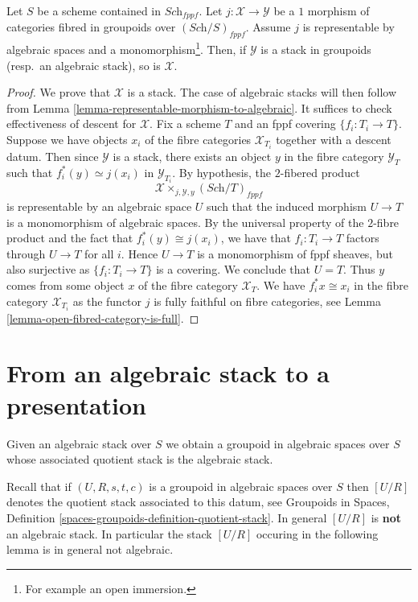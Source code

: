 \begin{lemma}
\label{lemma-open-fibred-category-is-algebraic} 
Let $S$ be a scheme contained in $\textit{Sch}_{fppf}$. 
Let $j : \mathcal X \to \mathcal Y$ be a $1$ morphism of
categories fibred in groupoids over $(\textit{Sch}/S)_{fppf}$.
Assume $j$ is representable by algebraic spaces and a
monomorphism\footnote{For example an open immersion.}.
Then, if $\mathcal{Y}$ is a stack in groupoids (resp.\ an algebraic stack),
so is $\mathcal{X}$. 
\end{lemma}

\begin{proof}
We prove that $\mathcal X$ is a stack.
The case of algebraic stacks will then follow from Lemma 
\ref{lemma-representable-morphism-to-algebraic}. 
It suffices to check effectiveness of descent for $\mathcal X$.
Fix a scheme $T$ and an fppf covering $\{f_i : T_i \to T\}$.
Suppose we have objects $x_i$ of the fibre categories
$\mathcal{X}_{T_i}$ together with a descent datum.
Then since $\mathcal{Y}$ is a stack, there exists an object
$y$ in the fibre category $\mathcal{Y}_{T}$ such that
$f_i^*(y) \simeq j(x_i)$ in $\mathcal{Y}_{T_i}$.
By hypothesis, the $2$-fibered product
$$
\mathcal X \times_{j, \mathcal Y, y} (\textit{Sch}/T)_{fppf}
$$
is representable by an algebraic space $U$ such that the induced morphism
$U \to T$ is a monomorphism of algebraic spaces. By the universal property
of the $2$-fibre product and the fact that $f_i^*(y) \cong j(x_i)$, we have
that $f_i : T_i \to T$ factors through $U \to T$ for all $i$.
Hence $U \to T$ is a monomorphism of fppf sheaves, but also surjective
as $\{f_i : T_i \to T\}$ is a covering.
We conclude that $U = T$. Thus $y$ comes from some
object $x$ of the fibre category $\mathcal{X}_T$. We have
$f_i^*x \cong x_i$ in the fibre category $\mathcal{X}_{T_i}$ as the
functor $j$ is fully faithful on fibre categories, see
Lemma \ref{lemma-open-fibred-category-is-full}.
\end{proof}



\section{From an algebraic stack to a presentation}
\label{section-stack-to-presentation}

\noindent
Given an algebraic stack over $S$ we obtain a groupoid in algebraic spaces
over $S$ whose associated quotient stack is the algebraic stack.

\medskip\noindent
Recall that if $(U, R, s, t, c)$ is a groupoid in algebraic spaces over $S$
then $[U/R]$ denotes the quotient stack associated to this datum, see
Groupoids in Spaces,
Definition \ref{spaces-groupoids-definition-quotient-stack}.
In general $[U/R]$ is {\bf not} an algebraic stack. In particular the
stack $[U/R]$ occuring in the following lemma is in general not
algebraic.

